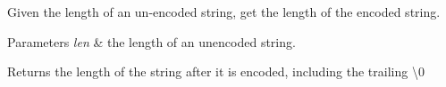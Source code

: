 Given the length of an un-\/encoded string, get the length of the encoded string. 
\begin{DoxyParams}{Parameters}
{\em len} & the length of an unencoded string. \\
\hline
\end{DoxyParams}
\begin{DoxyReturn}{Returns}
the length of the string after it is encoded, including the trailing \textbackslash{}0 
\end{DoxyReturn}
